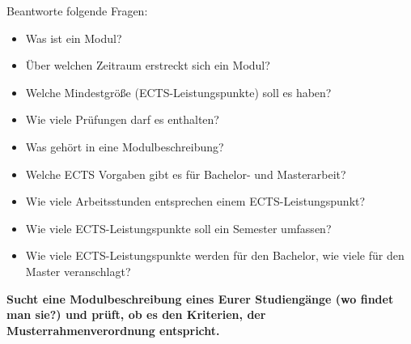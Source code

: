 \documentclass{scrartcl}
\begin{document}
\vspace{0.5 cm}

Beantworte folgende Fragen:
\begin{itemize}
	\item Was ist ein Modul?
	\item Über welchen Zeitraum erstreckt sich ein Modul?
	\item Welche Mindestgröße (ECTS-Leistungspunkte) soll es haben?
	\item Wie viele Prüfungen darf es enthalten?
	\item Was gehört in eine Modulbeschreibung?
	\item Welche ECTS Vorgaben gibt es für Bachelor- und Masterarbeit?
	\item Wie viele Arbeitsstunden entsprechen einem ECTS-Leistungspunkt?
	\item Wie viele ECTS-Leistungspunkte soll ein Semester umfassen?
	\item Wie viele ECTS-Leistungspunkte werden für den Bachelor, wie viele für den Master veranschlagt?
	\end{itemize}
	
\textbf{Sucht eine Modulbeschreibung eines Eurer Studiengänge (wo findet man sie?) und prüft, ob es den Kriterien, der Musterrahmenverordnung entspricht.}
\end{document}

